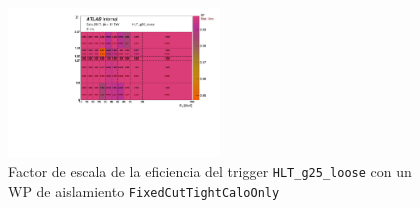 \begin{figure}

	\centering

  \caption{Factor de escala de la eficiencia del trigger \texttt{HLT\_g25\_loose} con un WP de aislamiento \texttt{FixedCutTightCaloOnly}  \commentNotaIII}

  \includegraphics[width=0.5\textwidth]{images/2017_h_sf_et_eta_tr_HLT_g25_loose_FixedCutTightCaloOnly.pdf}

  \label{SFfig}
\end{figure}


